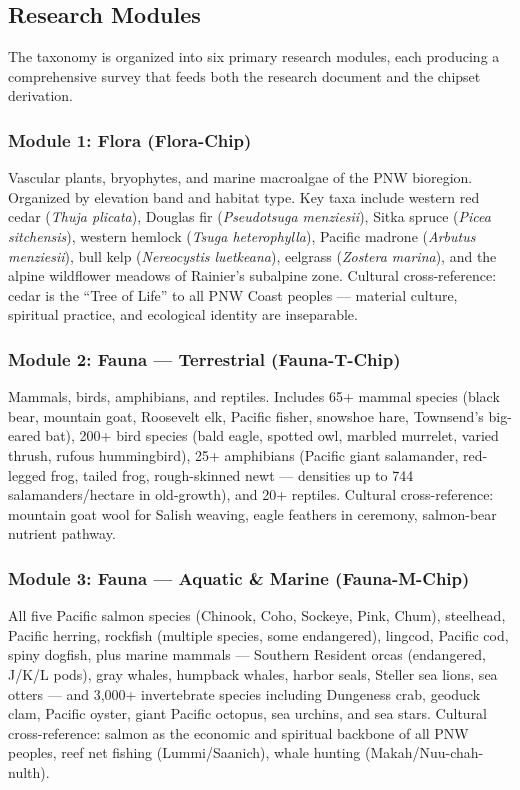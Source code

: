 \documentclass[11pt,letterpaper]{article}
\begin{document}
\subsection{Research Modules}

The taxonomy is organized into six primary research modules, each producing a comprehensive survey that feeds both the research document and the chipset derivation.

\subsubsection{Module 1: Flora (Flora-Chip)}

Vascular plants, bryophytes, and marine macroalgae of the PNW bioregion. Organized by elevation band and habitat type. Key taxa include western red cedar (\emph{Thuja plicata}), Douglas fir (\emph{Pseudotsuga menziesii}), Sitka spruce (\emph{Picea sitchensis}), western hemlock (\emph{Tsuga heterophylla}), Pacific madrone (\emph{Arbutus menziesii}), bull kelp (\emph{Nereocystis luetkeana}), eelgrass (\emph{Zostera marina}), and the alpine wildflower meadows of Rainier's subalpine zone. Cultural cross-reference: cedar is the ``Tree of Life'' to all PNW Coast peoples --- material culture, spiritual practice, and ecological identity are inseparable.

\subsubsection{Module 2: Fauna --- Terrestrial (Fauna-T-Chip)}

Mammals, birds, amphibians, and reptiles. Includes 65+ mammal species (black bear, mountain goat, Roosevelt elk, Pacific fisher, snowshoe hare, Townsend's big-eared bat), 200+ bird species (bald eagle, spotted owl, marbled murrelet, varied thrush, rufous hummingbird), 25+ amphibians (Pacific giant salamander, red-legged frog, tailed frog, rough-skinned newt --- densities up to 744 salamanders/hectare in old-growth), and 20+ reptiles. Cultural cross-reference: mountain goat wool for Salish weaving, eagle feathers in ceremony, salmon-bear nutrient pathway.

\subsubsection{Module 3: Fauna --- Aquatic \& Marine (Fauna-M-Chip)}

All five Pacific salmon species (Chinook, Coho, Sockeye, Pink, Chum), steelhead, Pacific herring, rockfish (multiple species, some endangered), lingcod, Pacific cod, spiny dogfish, plus marine mammals --- Southern Resident orcas (endangered, J/K/L pods), gray whales, humpback whales, harbor seals, Steller sea lions, sea otters --- and 3,000+ invertebrate species including Dungeness crab, geoduck clam, Pacific oyster, giant Pacific octopus, sea urchins, and sea stars. Cultural cross-reference: salmon as the economic and spiritual backbone of all PNW peoples, reef net fishing (Lummi/Saanich), whale hunting (Makah/Nuu-chah-nulth).
\end{document}
